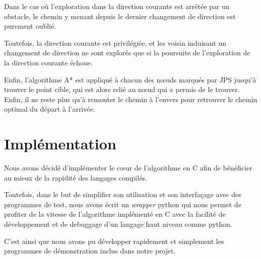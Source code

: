 \documentclass[a4paper,10pt]{article}
\begin{document}
\begin{description}
Dans le cas où l'exploration dans la direction courante est arrêtée par un obstacle, le chemin y menant depuis le dernier 
changement de direction est purement oublié.

Toutefois, la direction courante est privilégiée, et les voisin induisant un changement de direction ne sont explorés que si
la poursuite de l'exploration de la direction courante échoue.
\end{description}

Enfin, l'algorithme A* est appliqué à chacun des nœuds marqués par JPS jusqu'à trouver le point cible, qui est alors relié au 
nœud qui a permis de le trouver. Enfin, il ne reste plus qu'à remonter le chemin à l'envers pour retrouver le chemin optimal 
du départ à l'arrivée.
\section{Implémentation}
Nous avons décidé d'implémenter le cœur de l'algorithme en C afin de bénéficier au mieux de la rapidité des langages compilés.

Toutefois, dans le but de simplifier son utilisation et son interfaçage avec des programmes de test, nous avons écrit un 
\emph{wrapper} python qui nous permet de profiter de la vitesse de l'algorithme implémenté en C avec la facilité de développement 
et de debuggage d'un langage haut niveau comme python.

C'est ainsi que nous avons pu développer rapidement et simplement les programmes de démonstration inclus dans notre projet.
\end{document}
